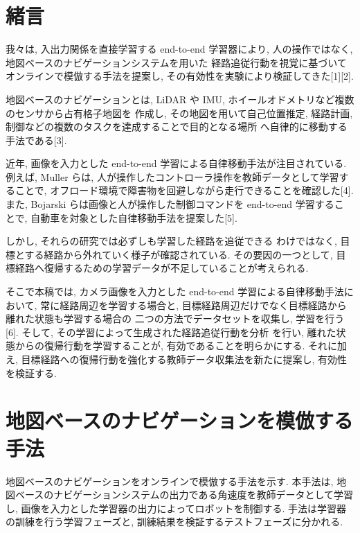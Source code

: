 \documentclass{jarticle}
\begin{document}
\date{} 

\maketitle
\thispagestyle{empty}
\pagestyle{empty}

\small

\section{緒言}
我々は, 入出力関係を直接学習する end-to-end 学習器により,
人の操作ではなく, 地図ベースのナビゲーションシステムを用いた
経路追従行動を視覚に基づいてオンラインで模倣する手法を提案し,
その有効性を実験により検証してきた[1][2].

地図ベースのナビゲーションとは, LiDAR や IMU, ホイールオドメトリなど複数のセンサから占有格子地図を
作成し, その地図を用いて自己位置推定, 経路計画, 制御などの複数のタスクを達成することで目的となる場所
へ自律的に移動する手法である[3].

近年, 画像を入力とした end-to-end 学習による自律移動手法が注目されている.
例えば, Muller らは, 人が操作したコントローラ操作を教師データとして学習することで, 
オフロード環境で障害物を回避しながら走行できることを確認した[4].
また, Bojarski らは画像と人が操作した制御コマンドを end-to-end 学習するこ
とで, 自動車を対象とした自律移動手法を提案した[5].

しかし, それらの研究では必ずしも学習した経路を追従できる
わけではなく, 目標とする経路から外れていく様子が確認されている.
その要因の一つとして, 目標経路へ復帰するための学習データが不足していることが考えられる.

そこで本稿では, カメラ画像を入力とした end-to-end 学習による自律移動手法において,
常に経路周辺を学習する場合と, 目標経路周辺だけでなく目標経路から離れた状態も学習する場合の
二つの方法でデータセットを収集し, 学習を行う[6]. そして, その学習によって生成された経路追従行動を分析
を行い, 離れた状態からの復帰行動を学習することが, 有効であることを明らかにする. それに加え, 
目標経路への復帰行動を強化する教師データ収集法を新たに提案し, 有効性を検証する.

 
\section{地図ベースのナビゲーションを模倣する手法}
地図ベースのナビゲーションをオンラインで模倣する手法を示す.
本手法は, 地図ベースのナビゲーションシステムの出力である角速度を教師データとして学習し, 
画像を入力とした学習器の出力によってロボットを制御する. 
手法は学習器の訓練を行う学習フェーズと, 訓練結果を検証するテストフェーズに分かれる.
\end{document}
